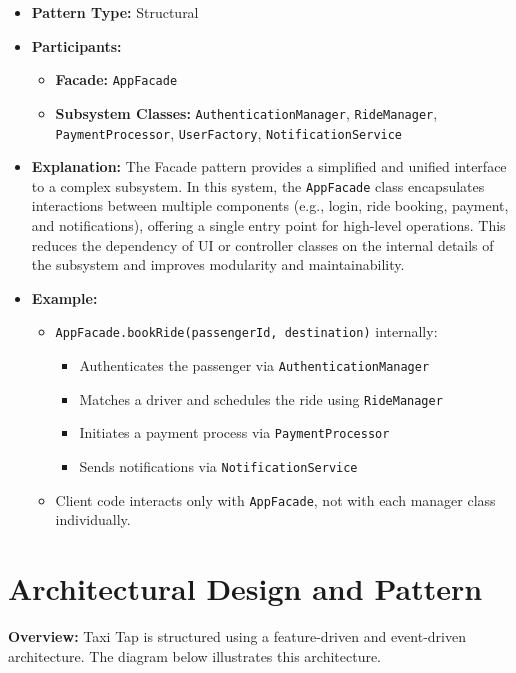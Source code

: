 \documentclass[12pt]{article}
\begin{document}
\begin{itemize}
  \item \textbf{Pattern Type:} Structural
  \item \textbf{Participants:}
    \begin{itemize}
      \item \textbf{Facade:} \texttt{AppFacade}
      \item \textbf{Subsystem Classes:} \texttt{AuthenticationManager}, \texttt{RideManager}, \texttt{PaymentProcessor}, \texttt{UserFactory}, \texttt{NotificationService}
    \end{itemize}
  \item \textbf{Explanation:} The Facade pattern provides a simplified and unified interface to a complex subsystem. In this system, the \texttt{AppFacade} class encapsulates interactions between multiple components (e.g., login, ride booking, payment, and notifications), offering a single entry point for high-level operations. This reduces the dependency of UI or controller classes on the internal details of the subsystem and improves modularity and maintainability.
  \item \textbf{Example:}
    \begin{itemize}
      \item \texttt{AppFacade.bookRide(passengerId, destination)} internally:
      \begin{itemize}
        \item Authenticates the passenger via \texttt{AuthenticationManager}
        \item Matches a driver and schedules the ride using \texttt{RideManager}
        \item Initiates a payment process via \texttt{PaymentProcessor}
        \item Sends notifications via \texttt{NotificationService}
      \end{itemize}
      \item Client code interacts only with \texttt{AppFacade}, not with each manager class individually.
    \end{itemize}
\end{itemize}

\section{Architectural Design and Pattern}
\textbf{Overview:} Taxi Tap is structured using a feature-driven and event-driven architecture. The diagram below illustrates this architecture.
\end{document}
